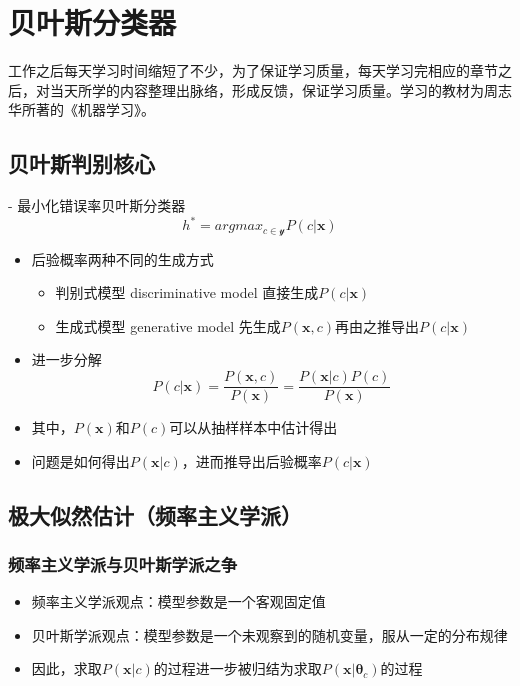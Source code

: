\chapter{贝叶斯分类器}

工作之后每天学习时间缩短了不少，为了保证学习质量，每天学习完相应的章节之后，对当天所学的内容整理出脉络，形成反馈，保证学习质量。学习的教材为周志华所著的《机器学习》。

\section{贝叶斯判别核心}

- 最小化错误率贝叶斯分类器
\begin{equation}
h^\ast=argmax_{c\in \mathcal{y}}P(c|\mathbf{x})
\end{equation}

\begin{itemize}
\item 后验概率两种不同的生成方式
    \begin{itemize}
    \item 判别式模型 discriminative model 直接生成$P(c|\mathbf{x})$
    \item 生成式模型 generative model 先生成$P(\mathbf{x}, c)$再由之推导出$P(c|\mathbf{x})$
    \end{itemize}
\item 进一步分解
    \begin{equation}
    P(c|\mathbf{x})=\frac{P(\mathbf{x}, c)}{P(\mathbf{x})}=\frac{P(\mathbf{x}|c)P(c)}{P(\mathbf{x})}
    \end{equation}
    \item 其中，$P(\mathbf{x})$和$P(c)$可以从抽样样本中估计得出
    \item 问题是如何得出$P(\mathbf{x}|c)$，进而推导出后验概率$P(c|\mathbf{x})$
\end{itemize}

\section{极大似然估计（频率主义学派）}

\subsection{频率主义学派与贝叶斯学派之争}

\begin{itemize}
\item 频率主义学派观点：模型参数是一个客观固定值
\item 贝叶斯学派观点：模型参数是一个未观察到的随机变量，服从一定的分布规律
\item 因此，求取$P(\mathbf{x}|c)$的过程进一步被归结为求取$P(\mathbf{x}|\mathbf{\theta}_c)$的过程
\end{itemize}

